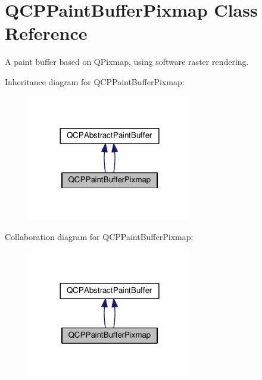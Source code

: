 \hypertarget{class_q_c_p_paint_buffer_pixmap}{}\section{Q\+C\+P\+Paint\+Buffer\+Pixmap Class Reference}
\label{class_q_c_p_paint_buffer_pixmap}


A paint buffer based on Q\+Pixmap, using software raster rendering.  




Inheritance diagram for Q\+C\+P\+Paint\+Buffer\+Pixmap\+:\nopagebreak
\begin{figure}[H]
\begin{center}
\leavevmode
\includegraphics[width=204pt]{class_q_c_p_paint_buffer_pixmap__inherit__graph}
\end{center}
\end{figure}


Collaboration diagram for Q\+C\+P\+Paint\+Buffer\+Pixmap\+:\nopagebreak
\begin{figure}[H]
\begin{center}
\leavevmode
\includegraphics[width=204pt]{class_q_c_p_paint_buffer_pixmap__coll__graph}
\end{center}
\end{figure}
